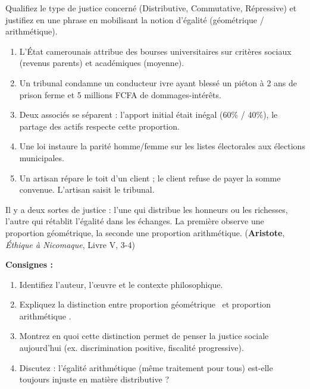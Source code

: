 \documentclass[11pt]{article}
\begin{document}
\begin{exercice}
Qualifiez le type de justice concerné (Distributive, Commutative, Répressive) et justifiez en une phrase en mobilisant la notion d'égalité (géométrique / arithmétique).
\begin{enumerate}
    \item L'État camerounais attribue des bourses universitaires sur critères sociaux (revenus parents) et académiques (moyenne).
    \item Un tribunal condamne un conducteur ivre ayant blessé un piéton à 2 ans de prison ferme et 5 millions FCFA de dommages-intérêts.
    \item Deux associés se séparent : l'apport initial était inégal (60\% / 40\%), le partage des actifs respecte cette proportion.
    \item Une loi instaure la parité homme/femme sur les listes électorales aux élections municipales.
    \item Un artisan répare le toit d'un client ; le client refuse de payer la somme convenue. L'artisan saisit le tribunal.
\end{enumerate}
\end{exercice}

\begin{exercice}
\guillemotleft Il y a deux sortes de justice : l'une qui distribue les honneurs ou les richesses, l'autre qui rétablit l'égalité dans les échanges. La première observe une proportion géométrique, la seconde une proportion arithmétique. \guillemotright
(\textbf{Aristote}, \emph{Éthique à Nicomaque}, Livre V, 3-4)

\textbf{Consignes :}
\begin{enumerate}
    \item Identifiez l'auteur, l'œuvre et le contexte philosophique.
    \item Expliquez la distinction entre \guillemotleft proportion géométrique \guillemotright\ et \guillemotleft proportion arithmétique \guillemotright.
    \item Montrez en quoi cette distinction permet de penser la justice sociale aujourd'hui (ex. discrimination positive, fiscalité progressive).
    \item Discutez : l'égalité arithmétique (même traitement pour tous) est-elle toujours injuste en matière distributive ?
\end{enumerate}
\end{exercice}
\end{document}
